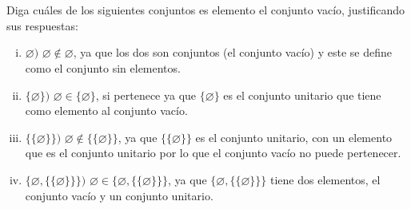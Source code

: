 \section{}
Diga cuáles de los siguientes conjuntos es elemento el conjunto vacío, justificando sus respuestas:
\begin{enumerate}[(i)]
\item $\varnothing)$  $\varnothing \notin \varnothing$, ya que los dos son conjuntos (el conjunto vacío) y este se define como el conjunto sin elementos.
\item $\{\varnothing\})$  $ \varnothing \in \{\varnothing\}$, si pertenece ya que $\{\varnothing\}$ es el conjunto unitario que tiene como elemento al conjunto vacío.
\item $\{\{ \varnothing\}\})$  $ \varnothing \notin \{\{ \varnothing\}\}$, ya que $\{\{ \varnothing\}\}$ es el conjunto unitario, con un elemento que es el conjunto unitario por lo que el conjunto vacío no puede pertenecer.
\item $\{\varnothing, \{\{ \varnothing\}\} \})$  $  \varnothing \in \{\varnothing, \{\{ \varnothing\}\} \}$, ya que $\{\varnothing, \{\{ \varnothing\}\} \}$ tiene dos elementos, el conjunto vacío y un conjunto unitario.
\end{enumerate}
